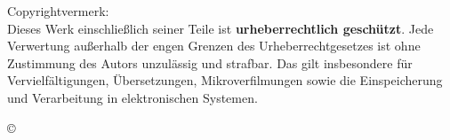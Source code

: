 \begin{titlepage}
\begin{flushleft}
\begin{tabular}{ll}
\end{tabular} 



\small
Copyrightvermerk:\\

Dieses Werk einschließlich seiner Teile ist \textbf{urheberrechtlich geschützt}. Jede Verwertung außerhalb der engen Grenzen des Urheberrechtgesetzes ist ohne Zustimmung des Autors unzulässig und strafbar. Das gilt insbesondere für Vervielfältigungen, Übersetzungen, Mikroverfilmungen sowie die Einspeicherung und Verarbeitung in elektronischen Systemen.
\end{flushleft}
\begin{flushright}
\copyright{} \jahr
\end{flushright}
\end{titlepage}

\cleardoublepage